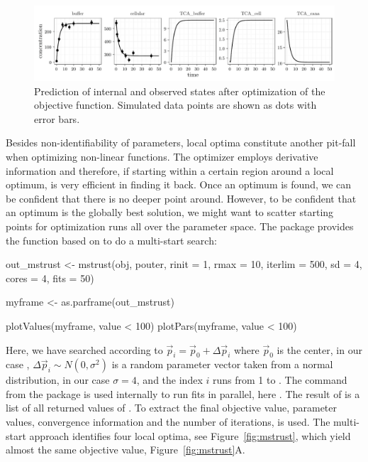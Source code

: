 \documentclass[article]{jss}
\begin{document}
\begin{figure}[ht]
	\centering
	\includegraphics[width = \textwidth]{images/figure4}
	\caption{Prediction of internal and observed states after optimization of the objective function. Simulated data points are shown as dots with error bars.}
	\label{fig:myfit}
\end{figure}

Besides non-identifiability of parameters, local optima constitute another pit-fall when optimizing non-linear functions. The  optimizer employs derivative information and therefore, if starting within a certain region around a local optimum, is very efficient in finding it back. Once an optimum is found, we can be confident that there is no deeper point around. However, to be confident that an optimum is the globally best solution, we might want to scatter starting points for optimization runs all over the parameter space. The  package provides the  function based on  to do a multi-start search:
\begin{CodeChunk}
\begin{CodeInput}
out_mstrust <- mstrust(obj, pouter, rinit = 1, rmax = 10, iterlim = 500,
                       sd = 4,
                       cores = 4, fits = 50)

myframe <- as.parframe(out_mstrust)

plotValues(myframe, value < 100)
plotPars(myframe, value < 100)
\end{CodeInput}
\end{CodeChunk}
Here, we have searched according to $\vec p_i = \vec p_0 + \Delta\vec p_i$ where $\vec p_0$ is the center, in our case , $\Delta\vec p_i\sim N(0, \sigma^2)$ is a random parameter vector taken from a normal distribution, in our case $\sigma = 4$, and the index $i$ runs from 1 to . The  command from the  package is used internally to run fits in parallel, here . The result of  is a list of all returned values of . To extract the final objective value, parameter values, convergence information and the number of iterations,  is used. The multi-start approach identifies four local optima, see Figure~\ref{fig:mstrust}, which yield almost the same objective value, Figure~\ref{fig:mstrust}A.
\end{document}
